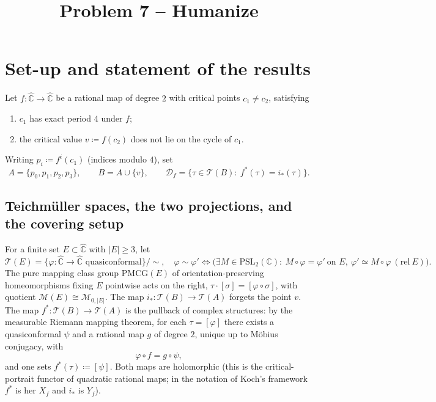 \documentclass[11pt]{article}
\theoremstyle{definition}
\theoremstyle{remark}
\newcommand{\Teich}{\mathcal T}
\newcommand{\MM}{\mathcal M}
\newcommand{\PMCG}{\mathrm{PMCG}}
\newcommand{\Chat}{\widehat{\mathbb C}}
\newcommand{\Df}{\mathcal D_f}
\begin{document}
\title{Problem 7 -- Humanize}
\author{}
\date{}
\maketitle

\section{Set-up and statement of the results}\label{sec:setup}

Let $f:\Chat\to\Chat$ be a rational map of degree $2$ with critical
points $c_1\neq c_2$, satisfying
\begin{enumerate}[label=(H\arabic*),leftmargin=3.2em]
\item $c_1$ has exact period $4$ under $f$;
\item the critical value $v\coloneqq f(c_2)$ does not lie on the cycle
of $c_1$.
\end{enumerate}
Writing $p_i\coloneqq f^{i}(c_1)$ (indices modulo $4$), set
\[
A=\{p_0,p_1,p_2,p_3\},\qquad B=A\cup\{v\},\qquad
\Df=\{\tau\in\Teich(B):\ f^*(\tau)=i_*(\tau)\}.
\]

\subsection{Teichm\"uller spaces, the two projections, and the covering
setup}

For a finite set $E\subset\Chat$ with $|E|\ge3$, let
\[
\Teich(E)=\{\varphi:\Chat\to\Chat\text{ quasiconformal}\}/{\sim},
\quad
\varphi\sim\varphi'\iff
\bigl(\exists M\in\mathrm{PSL}_2(\mathbb C):\ M\circ\varphi=\varphi'\
\text{on }E,\ \varphi'\simeq M\circ\varphi\ (\mathrm{rel}\ E)\bigr).
\]
The pure mapping class group $\PMCG(E)$ of orientation-preserving
homeomorphisms fixing $E$ pointwise acts on the right,
$\tau\cdot[\sigma]=[\varphi\circ\sigma]$, with quotient
$\MM(E)\cong\MM_{0,|E|}$.
The map $i_*:\Teich(B)\to\Teich(A)$ forgets the point $v$.
The map $f^*:\Teich(B)\to\Teich(A)$ is the pullback of complex
structures: by the measurable Riemann mapping theorem, for each
$\tau=[\varphi]$ there exists a quasiconformal $\psi$ and a rational
map $g$ of degree $2$, unique up to M\"obius conjugacy, with
\begin{equation}\label{eq:pullback}
\varphi\circ f=g\circ\psi,
\end{equation}
and one sets $f^*(\tau)\coloneqq[\psi]$.  Both maps are holomorphic
(this is the critical-portrait functor of quadratic rational maps;
in the notation of Koch's framework $f^*$ is her $X_f$ and $i_*$ is
$Y_f$).
\end{document}
